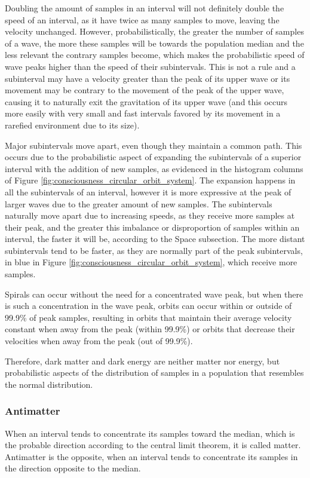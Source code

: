 Doubling the amount of samples in an interval will not definitely double the speed of an interval, as it have twice as many samples to move, leaving the velocity unchanged. However, probabilistically, the greater the number of samples of a wave, the more these samples will be towards the population median and the less relevant the contrary samples become, which makes the probabilistic speed of wave peaks higher than the speed of their subintervals. This is not a rule and a subinterval may have a velocity greater than the peak of its upper wave or its movement may be contrary to the movement of the peak of the upper wave, causing it to naturally exit the gravitation of its upper wave (and this occurs more easily with very small and fast intervals favored by its movement in a rarefied environment due to its size).

Major subintervals move apart, even though they maintain a common path. This occurs due to the probabilistic aspect of expanding the subintervals of a superior interval with the addition of new samples, as evidenced in the histogram columns of Figure \ref{fig:consciousness_circular_orbit_system}. The expansion happens in all the subintervals of an interval, however it is more expressive at the peak of larger waves due to the greater amount of new samples. The subintervals naturally move apart due to increasing speeds, as they receive more samples at their peak, and the greater this imbalance or disproportion of samples within an interval, the faster it will be, according to the Space subsection. The more distant subintervals tend to be faster, as they are normally part of the peak subintervals, in blue in Figure \ref{fig:consciousness_circular_orbit_system}, which receive more samples.

Spirals can occur without the need for a concentrated wave peak, but when there is such a concentration in the wave peak, orbits can occur within or outside of 99.9\% of peak samples, resulting in orbits that maintain their average velocity constant when away from the peak (within 99.9\%) or orbits that decrease their velocities when away from the peak (out of 99.9\%).

Therefore, dark matter and dark energy are neither matter nor energy, but probabilistic aspects of the distribution of samples in a population that resembles the normal distribution.

\subsubsection{Antimatter}
When an interval tends to concentrate its samples toward the median, which is the probable direction according to the central limit theorem, it is called matter. Antimatter is the opposite, when an interval tends to concentrate its samples in the direction opposite to the median. 

